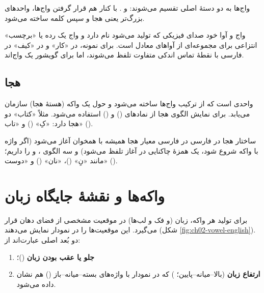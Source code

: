 واج‌ها به دو دستهٔ اصلی تقسیم می‌شوند:  و . با کنار هم قرار گرفتن واج‌ها، واحدهای بزرگ‌تر یعنی هجا و سپس کلمه ساخته می‌شود.

\begin{addedbox}{واج و آوا}
خود صدای فیزیکی که تولید می‌شود  نام دارد و واج یک رده یا «برچسب» انتزاعی برای مجموعه‌ای از آواهای معادل است. برای نمونه،  در «کار» و  در «کیف» در فارسی با نقطهٔ تماس اندکی متفاوت تلفظ می‌شوند، اما برای گویشور یک واج‌اند.
\end{addedbox}

\subsection{هجا}
 واحدی است که از ترکیب واج‌ها ساخته می‌شود و حول یک واکه (هستهٔ هجا) سازمان می‌یابد. برای نمایش الگوی هجا از نمادهای  () و  () استفاده می‌شود. مثلاً «کتاب» دو هجا دارد: «کِ» () و «تاب» ().

\begin{addedbox}{ساختار هجا در فارسی}
در فارسی معیار هجا همیشه با همخوان آغاز می‌شود (اگر واژه با واکه شروع شود، یک همزهٔ چاکنایی  در آغاز تلفظ می‌شود) و سه الگوی ،  و  را داریم؛ مانند «نِ» ()، «نان» () و «دوست» ().
\end{addedbox}

\section{واکه‌ها و نقشهٔ جایگاه زبان}

برای تولید هر واکه، زبان (و فک و لب‌ها) در موقعیت مشخصی از فضای دهان قرار می‌گیرد. این موقعیت‌ها را در نمودار  نمایش می‌دهند (شکل \ref{fig:ch02-vowel-english}). دو بُعد اصلی عبارت‌اند از:
\begin{enumerate}
  \item \textbf{جلو یا عقب بودن زبان} ()؛
  \item \textbf{ارتفاع زبان} (بالا–میانه–پایین؛ ) که در نمودار با واژه‌های بسته–میانه–باز () هم نشان داده می‌شود.
\end{enumerate}

\label{fig:ch02-vowel-english}

